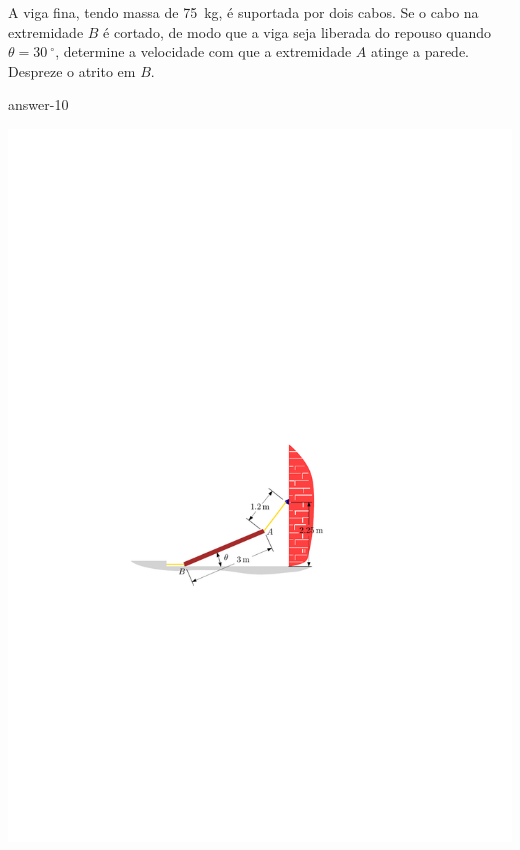 \item A viga fina, tendo massa de \SI{75}{\kilogram}, é suportada por dois cabos. Se o cabo na extremidade $B$ é cortado, de modo que a viga seja liberada do repouso quando $\theta=\SI{30}{^{\circ}}$, determine a velocidade com que a extremidade $A$ atinge a parede. Despreze o atrito em $B$.

{answer-10}

\vspace{-1cm}
\begin{flushright}
	\includegraphics[scale=1.2]{../../images/draw_4_1}
\end{flushright}